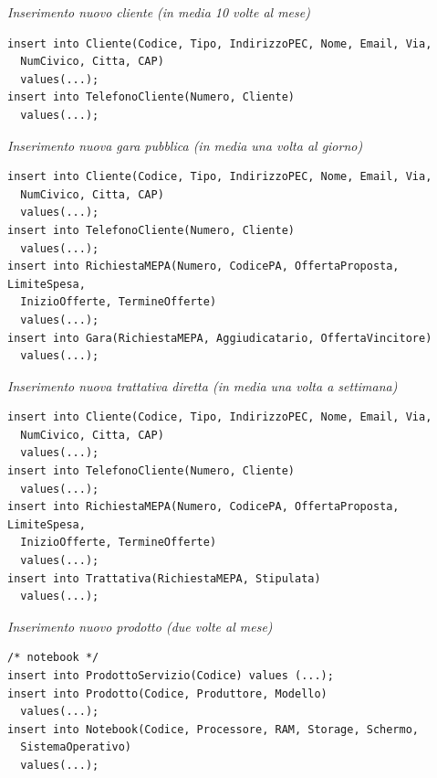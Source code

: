 \vspace{1cm}

\noindent\textit{Inserimento nuovo cliente (in media 10 volte al mese)}
\begin{verbatim}
insert into Cliente(Codice, Tipo, IndirizzoPEC, Nome, Email, Via,
  NumCivico, Citta, CAP)
  values(...);
insert into TelefonoCliente(Numero, Cliente)
  values(...);
\end{verbatim}
\vspace{1cm}

\noindent\textit{Inserimento nuova gara pubblica (in media una volta al giorno)}
\begin{verbatim}
insert into Cliente(Codice, Tipo, IndirizzoPEC, Nome, Email, Via,
  NumCivico, Citta, CAP)
  values(...);
insert into TelefonoCliente(Numero, Cliente)
  values(...);
insert into RichiestaMEPA(Numero, CodicePA, OffertaProposta, LimiteSpesa,
  InizioOfferte, TermineOfferte)
  values(...);
insert into Gara(RichiestaMEPA, Aggiudicatario, OffertaVincitore)
  values(...);
\end{verbatim}
\vspace{1cm}

\noindent\textit{Inserimento nuova trattativa diretta (in media una volta a settimana)}
\begin{verbatim}
insert into Cliente(Codice, Tipo, IndirizzoPEC, Nome, Email, Via,
  NumCivico, Citta, CAP)
  values(...);
insert into TelefonoCliente(Numero, Cliente)
  values(...);
insert into RichiestaMEPA(Numero, CodicePA, OffertaProposta, LimiteSpesa,
  InizioOfferte, TermineOfferte)
  values(...);
insert into Trattativa(RichiestaMEPA, Stipulata)
  values(...);
\end{verbatim}
\vspace{1cm}

\noindent\textit{Inserimento nuovo prodotto (due volte al mese)}
\begin{verbatim}
/* notebook */
insert into ProdottoServizio(Codice) values (...);
insert into Prodotto(Codice, Produttore, Modello)
  values(...);
insert into Notebook(Codice, Processore, RAM, Storage, Schermo,
  SistemaOperativo)
  values(...);
\end{verbatim}
\vspace{1cm}

